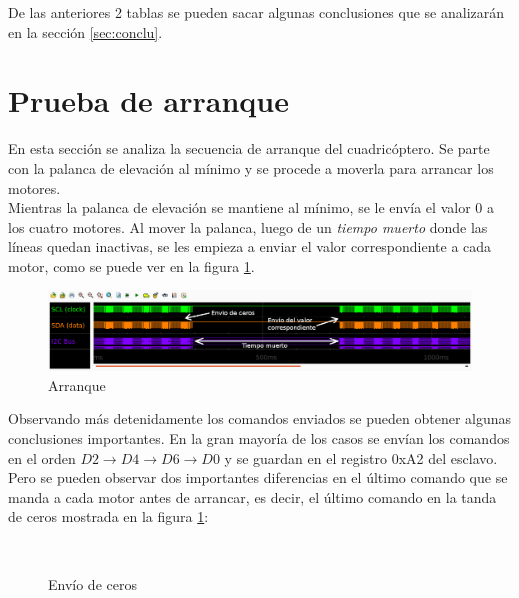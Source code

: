 \documentclass[main]{subfiles}
\begin{document}
De las anteriores 2 tablas se pueden sacar algunas conclusiones que se analizar\'an en la secci\'on \ref{sec:conclu}.

\section{Prueba de arranque}
\label{sec:arranque}

En esta secci\'on se analiza la secuencia de arranque del cuadric\'optero. Se parte con la palanca de elevaci\'on al m\'inimo y se procede a moverla para arrancar los motores.\\

Mientras la palanca de elevaci\'on se mantiene al m\'inimo, se le env\'ia el valor 0 a los cuatro motores. Al mover la palanca, luego de un \emph{tiempo muerto} donde las l\'ineas quedan inactivas, se les empieza a enviar el valor correspondiente a cada motor, como se puede ver en la figura \ref{fig:snif_arranque_lejos}.

\begin{figure}[h!]
	\centering
	\includegraphics[width=1\textwidth]{./pics_sniffer/snif_arranque_lejos.png}
	\caption{Arranque}
	\label{fig:snif_arranque_lejos}
\end{figure}

Observando m\'as detenidamente los comandos enviados se pueden obtener algunas conclusiones importantes. En la gran mayor\'ia de los casos se env\'ian los comandos en el orden $D2\rightarrow D4\rightarrow D6\rightarrow D0$ y se guardan en el registro 0xA2 del esclavo. Pero se pueden observar dos importantes diferencias en el \'ultimo comando que se manda a cada motor antes de arrancar, es decir, el \'ultimo comando en la tanda de ceros mostrada en la figura \ref{fig:snif_arranque_lejos}:

\begin{figure} [h!]
\centering
   \\
  \caption{Env\'io de ceros}
  \label{fig:snif_arranque_cerca}
\end{figure}
\end{document}
